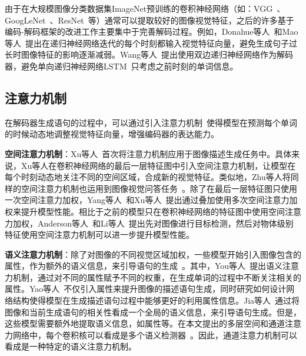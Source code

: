由于在大规模图像分类数据集ImageNet预训练的卷积神经网络（如：VGG~\cite{simonyan2015very}、GoogLeNet~\cite{szegedy2015going}、ResNet~\cite{he2016deep}等）通常可以提取较好的图像视觉特征，之后的许多基于编码-解码框架的改进工作主要集中于完善解码过程。例如，Donahue等人~\cite{donahue2015long}和Mao等人~\cite{mao2015deep}提出在递归神经网络迭代的每个时刻都输入视觉特征向量，避免生成句子过长时图像特征的影响逐渐减弱。Wang等人~\cite{wang2016image}提出使用双边递归神经网络作为解码器，避免单向递归神经网络LSTM~\cite{hochreiter1997long}只考虑之前时刻的单词信息。

\subsection{注意力机制}

在解码器生成语句的过程中，可以通过引入注意力机制~\cite{bahdanau2014neural}使得模型在预测每个单词的时候动态地调整视觉特征向量，增强编码器的表达能力。

\textbf{空间注意力机制}：Xu等人~\cite{xu2015show}首次将注意力机制应用于图像描述生成任务中。具体来说，Xu等人在卷积神经网络的最后一层特征图中引入空间注意力机制，让模型在每个时刻动态地关注不同的空间区域，合成新的视觉特征。类似地，Zhu等人将同样的空间注意力机制也运用到图像视觉问答任务~\cite{zhu2016visual7w}。除了在最后一层特征图只使用一次空间注意力加权，Yang等人~\cite{yang2016stacked}和Xu等人~\cite{xu2016ask}提出通过叠加使用多次空间注意力加权来提升模型性能。相比于之前的模型只在卷积神经网络的特征图中使用空间注意力加权，Anderson等人~\cite{anderson2018bottom}和Li等人~\cite{li2016visual}提出先对图像进行目标检测，然后对物体级别特征使用空间注意力机制可以进一步提升模型性能。

\textbf{语义注意力机制}：除了对图像的不同视觉区域加权，一些模型开始引入图像包含的属性，作为额外的语义信息，来引导语句的生成~\cite{wu2016what,you2016image,pan2017video,yao2017boosting}。其中，You等人~\cite{you2016image}提出语义注意力机制，通过对不同的属性赋予不同的权重，在生成单词的过程中不断关注相关的属性。Yao等人~\cite{yao2017boosting}不仅引入属性来提升图像的描述语句生成，同时研究如何设计网络结构使得模型在生成描述语句过程中能够更好的利用属性信息。Jia等人~\cite{jia2015guiding}通过将图像和当前生成语句的相关性看成一个全局的语义信息，来引导语句生成。但是，这些模型需要额外地提取语义信息，如属性等。在本文提出的多层空间和通道注意力网络中，每个卷积核可以看成是多个语义检测器~\cite{zeiler2014visualizing}。因此，通道注意力机制可以看成是一种特定的语义注意力机制。



